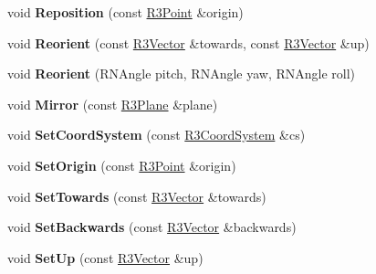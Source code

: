 \begin{DoxyCompactItemize}
\item 
void {\bfseries Reposition} (const \hyperlink{class_r3_point}{R3\+Point} \&origin)\hypertarget{class_r3_camera_a9614931af325a72c0385914ced225f0e}{}\label{class_r3_camera_a9614931af325a72c0385914ced225f0e}

\item 
void {\bfseries Reorient} (const \hyperlink{class_r3_vector}{R3\+Vector} \&towards, const \hyperlink{class_r3_vector}{R3\+Vector} \&up)\hypertarget{class_r3_camera_a4a75633f8e01c81a40a0f5e823a3241a}{}\label{class_r3_camera_a4a75633f8e01c81a40a0f5e823a3241a}

\item 
void {\bfseries Reorient} (R\+N\+Angle pitch, R\+N\+Angle yaw, R\+N\+Angle roll)\hypertarget{class_r3_camera_ab5f8497da9194f3792ab4f7a5ba114a1}{}\label{class_r3_camera_ab5f8497da9194f3792ab4f7a5ba114a1}

\item 
void {\bfseries Mirror} (const \hyperlink{class_r3_plane}{R3\+Plane} \&plane)\hypertarget{class_r3_camera_a96234194e954ce5045cb8d4510de72bd}{}\label{class_r3_camera_a96234194e954ce5045cb8d4510de72bd}

\item 
void {\bfseries Set\+Coord\+System} (const \hyperlink{class_r3_coord_system}{R3\+Coord\+System} \&cs)\hypertarget{class_r3_camera_af1d9a9e5420453c338f74b7982a903ef}{}\label{class_r3_camera_af1d9a9e5420453c338f74b7982a903ef}

\item 
void {\bfseries Set\+Origin} (const \hyperlink{class_r3_point}{R3\+Point} \&origin)\hypertarget{class_r3_camera_ad88451b2318bc8101bd6ec133761439f}{}\label{class_r3_camera_ad88451b2318bc8101bd6ec133761439f}

\item 
void {\bfseries Set\+Towards} (const \hyperlink{class_r3_vector}{R3\+Vector} \&towards)\hypertarget{class_r3_camera_a53312c419ccdc131a019c86773622b06}{}\label{class_r3_camera_a53312c419ccdc131a019c86773622b06}

\item 
void {\bfseries Set\+Backwards} (const \hyperlink{class_r3_vector}{R3\+Vector} \&backwards)\hypertarget{class_r3_camera_aca28b6e5d7463ade06168728adae01bc}{}\label{class_r3_camera_aca28b6e5d7463ade06168728adae01bc}

\item 
void {\bfseries Set\+Up} (const \hyperlink{class_r3_vector}{R3\+Vector} \&up)\hypertarget{class_r3_camera_ab6396e059466f0932b27c2b860559444}{}\label{class_r3_camera_ab6396e059466f0932b27c2b860559444}


\end{DoxyCompactItemize}
